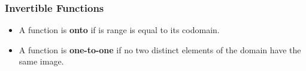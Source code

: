 \documentclass{beamer}
\begin{document}
\begin{frame}
\frametitle{Invertible Functions}
\Large
\vspace{-2cm}

\begin{itemize}
\item A function is \textbf{onto} if is range is equal to its codomain.

\item A function is \textbf{one-to-one} if no two distinct elements of the domain have the same image.
\end{itemize}
\end{frame}
\end{document}
